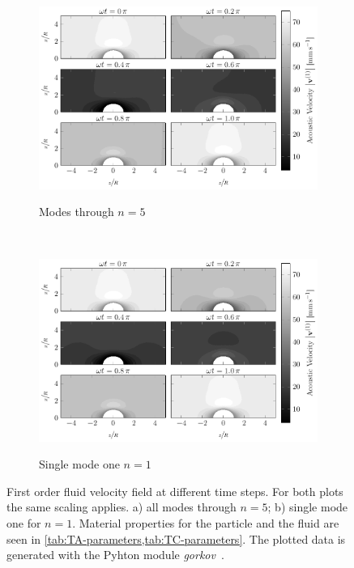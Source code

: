 \begin{figure}
  \centering
  \begin{subfigure}[b]{\textwidth}
    \centering
    \caption{Modes through $n=5$}
    \includegraphics[]{Plots/cache/SC_all.pdf}
    \label{fig:TA-SC_all}
  \end{subfigure}\\%
  \begin{subfigure}[b]{\textwidth}
    \centering
    \caption{Single mode one $n=1$}
    \includegraphics[]{Plots/cache/SC_mode1.pdf}
    \label{fig:TA-SC_mode1}
  \end{subfigure}
  \caption{First order fluid velocity field at different time steps. For both 
  plots the same scaling applies. a) all modes through $n=5$; b) single mode 
one for $n=1$. Material properties for the particle and the fluid are seen in 
\cref{tab:TA-parameters,tab:TC-parameters}. The plotted data is generated with 
the Pyhton module \emph{gorkov}~\cite{pypi}.}
  \label{fig:TA-SC}
\end{figure}

